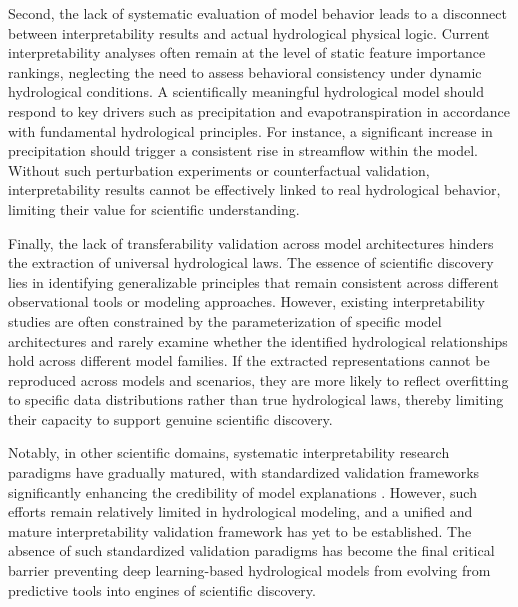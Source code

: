 Second, the lack of systematic evaluation of model behavior leads to a disconnect between interpretability results and actual hydrological physical logic. Current interpretability analyses often remain at the level of static feature importance rankings\cite{ZHOU2026103254,XIA2026103232}, neglecting the need to assess behavioral consistency under dynamic hydrological conditions\cite{10.2166/wcc.2017.149}. A scientifically meaningful hydrological model should respond to key drivers such as precipitation and evapotranspiration in accordance with fundamental hydrological principles\cite{hess-30-1077-2026}. For instance, a significant increase in precipitation should trigger a consistent rise in streamflow within the model\cite{nearing2021role}. Without such perturbation experiments or counterfactual validation\cite{simic2025perturbation,ZHANG2025123192}, interpretability results cannot be effectively linked to real hydrological behavior\cite{read2019process}, limiting their value for scientific understanding.

Finally, the lack of transferability validation across model architectures hinders the extraction of universal hydrological laws. The essence of scientific discovery lies in identifying generalizable principles that remain consistent across different observational tools or modeling approaches\cite{pmlr-v235-wang24j}. However, existing interpretability studies are often constrained by the parameterization of specific model architectures and rarely examine whether the identified hydrological relationships hold across different model families. If the extracted representations cannot be reproduced across models and scenarios, they are more likely to reflect overfitting to specific data distributions rather than true hydrological laws\cite{li2022transferability}, thereby limiting their capacity to support genuine scientific discovery.

Notably, in other scientific domains, systematic interpretability research paradigms have gradually matured, with standardized validation frameworks significantly enhancing the credibility of model explanations \cite{Haufe2026ExplainableAI}. However, such efforts remain relatively limited in hydrological modeling, and a unified and mature interpretability validation framework has yet to be established. The absence of such standardized validation paradigms has become the final critical barrier preventing deep learning-based hydrological models from evolving from predictive tools into engines of scientific discovery.

